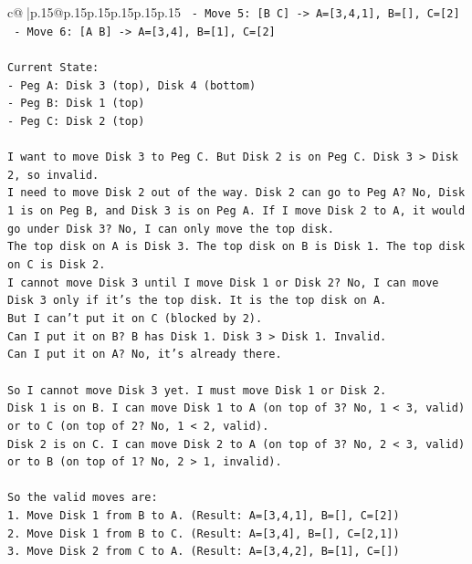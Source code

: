 \documentclass{article}
\begin{document}
{\begin{supertabular}{c@{$\;$}|p{.15\linewidth}@{}p{.15\linewidth}p{.15\linewidth}p{.15\linewidth}p{.15\linewidth}p{.15\linewidth}}
{{{\texttt{  {-} Move 5: {[}B C{]} {-}> A={[}3,4,1{]}, B={[}{]}, C={[}2{]}} \\
\texttt{  {-} Move 6: {[}A B{]} {-}> A={[}3,4{]}, B={[}1{]}, C={[}2{]}} \\
\\ 
\texttt{Current State:} \\
\texttt{{-} Peg A: Disk 3 (top), Disk 4 (bottom)} \\
\texttt{{-} Peg B: Disk 1 (top)} \\
\texttt{{-} Peg C: Disk 2 (top)} \\
\\ 
\texttt{I want to move Disk 3 to Peg C. But Disk 2 is on Peg C. Disk 3 > Disk 2, so invalid.} \\
\texttt{I need to move Disk 2 out of the way. Disk 2 can go to Peg A? No, Disk 1 is on Peg B, and Disk 3 is on Peg A. If I move Disk 2 to A, it would go under Disk 3? No, I can only move the top disk.} \\
\texttt{The top disk on A is Disk 3. The top disk on B is Disk 1. The top disk on C is Disk 2.} \\
\texttt{I cannot move Disk 3 until I move Disk 1 or Disk 2? No, I can move Disk 3 only if it's the top disk. It is the top disk on A.} \\
\texttt{But I can't put it on C (blocked by 2).} \\
\texttt{Can I put it on B? B has Disk 1. Disk 3 > Disk 1. Invalid.} \\
\texttt{Can I put it on A? No, it's already there.} \\
\\ 
\texttt{So I cannot move Disk 3 yet. I must move Disk 1 or Disk 2.} \\
\texttt{Disk 1 is on B. I can move Disk 1 to A (on top of 3? No, 1 < 3, valid) or to C (on top of 2? No, 1 < 2, valid).} \\
\texttt{Disk 2 is on C. I can move Disk 2 to A (on top of 3? No, 2 < 3, valid) or to B (on top of 1? No, 2 > 1, invalid).} \\
\\ 
\texttt{So the valid moves are:} \\
\texttt{1. Move Disk 1 from B to A. (Result: A={[}3,4,1{]}, B={[}{]}, C={[}2{]})} \\
\texttt{2. Move Disk 1 from B to C. (Result: A={[}3,4{]}, B={[}{]}, C={[}2,1{]})} \\
\texttt{3. Move Disk 2 from C to A. (Result: A={[}3,4,2{]}, B={[}1{]}, C={[}{]})} \\
}}}
\end{supertabular}}
\end{document}
